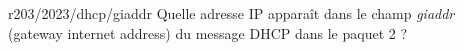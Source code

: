 \begin{question}{r203/2023/dhcp/giaddr}
  Quelle adresse IP apparaît dans le champ {\em giaddr} (gateway
  internet address) du message DHCP dans le paquet 2 ? 
  \begin{reponses}[3]
    \lastchoices
  \end{reponses}
\end{question}
